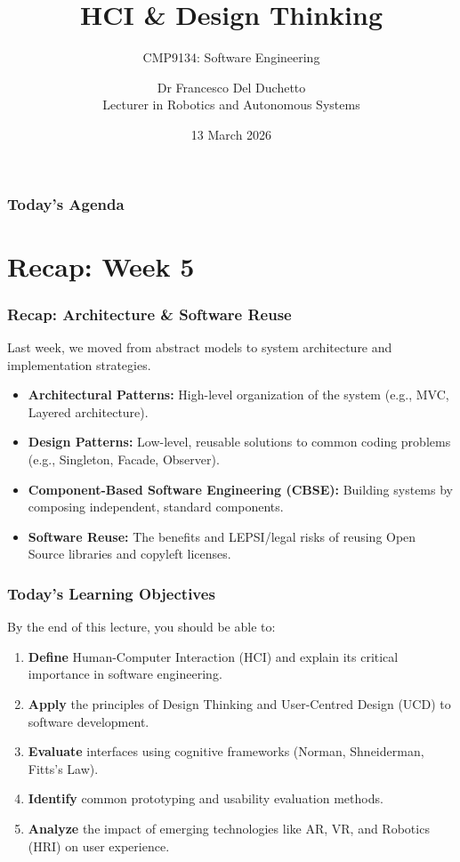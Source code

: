 \documentclass[xcolor=table]{beamer}
\title[CMP9134 - Week 6]{HCI \& Design Thinking}
\subtitle{CMP9134: Software Engineering}
\author[Francesco Del Duchetto]{Dr Francesco Del Duchetto\\Lecturer in Robotics and Autonomous Systems}
\institute[University of Lincoln]{University of Lincoln}
\date{13 March 2026}
\begin{document}
\begin{frame}
    \titlepage
\end{frame}

\begin{frame}
    \frametitle{Today's Agenda}
    \tableofcontents
\end{frame}

\section{Recap: Week 5}

\begin{frame}
    \frametitle{Recap: Architecture \& Software Reuse}
    Last week, we moved from abstract models to system architecture and implementation strategies.
    
    \begin{itemize}
        \item \textbf{Architectural Patterns:} High-level organization of the system (e.g., MVC, Layered architecture).
        \item \textbf{Design Patterns:} Low-level, reusable solutions to common coding problems (e.g., Singleton, Facade, Observer).
        \item \textbf{Component-Based Software Engineering (CBSE):} Building systems by composing independent, standard components.
        \item \textbf{Software Reuse:} The benefits and LEPSI/legal risks of reusing Open Source libraries and copyleft licenses.
    \end{itemize}
\end{frame}

\begin{frame}
    \frametitle{Today's Learning Objectives}
    By the end of this lecture, you should be able to:
    \begin{enumerate}
        \item \textbf{Define} Human-Computer Interaction (HCI) and explain its critical importance in software engineering.
        \item \textbf{Apply} the principles of Design Thinking and User-Centred Design (UCD) to software development.
        \item \textbf{Evaluate} interfaces using cognitive frameworks (Norman, Shneiderman, Fitts's Law).
        \item \textbf{Identify} common prototyping and usability evaluation methods.
        \item \textbf{Analyze} the impact of emerging technologies like AR, VR, and Robotics (HRI) on user experience.
    \end{enumerate}
\end{frame}
\end{document}
